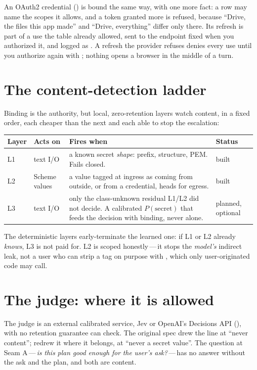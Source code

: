 An OAuth2 credential () is bound the same way, with one more fact:
a row may name the scopes it allows, and a token granted more is refused,
because ``Drive, the files this app made'' and ``Drive, everything'' differ
only there. Its refresh is part of a use the table already allowed, sent to
the endpoint fixed when you authorized it, and logged as
. A refresh the provider refuses denies every use until
you authorize again with ; nothing opens a
browser in the middle of a turn.

\section{The content-detection ladder}

Binding is the authority, but local, zero-retention layers watch content, in
a fixed order, each cheaper than the next and each able to stop the
escalation:

\begin{center}
\begin{tabular}{@{}lp{2.2cm}p{7.2cm}p{2.6cm}@{}}
\toprule
Layer & Acts on & Fires when & Status \\
\midrule
L1 & text I/O & a known secret \emph{shape}: prefix, structure, PEM. Fails closed. & built \\
L2 & Scheme values & a value tagged at ingress as coming from outside, or from a credential, heads for egress. & built \\
L3 & text I/O & only the class-unknown residual L1/L2 did not decide. A calibrated $P(\text{secret})$ that feeds the decision with binding, never alone. & planned, optional \\
\bottomrule
\end{tabular}
\end{center}

The deterministic layers early-terminate the learned one: if L1 or L2 already
\emph{knows}, L3 is not paid for. L2 is scoped honestly\,---\,it stops the
\emph{model's} indirect leak, not a user who can strip a tag on purpose with
, which only user-originated code may call.

\section{The judge: where it is allowed}

The judge is an external calibrated service, Jev or OpenAI's Decisions API
(), with no retention guarantee \nodwyn{} can check. The
original spec drew the line at ``never content'';  redrew it where
it belongs, at ``never a secret value''. The question at Seam A\,---\,\emph{is
this plan good enough for the user's ask?}\,---\,has no answer without the ask
and the plan, and both are content.

